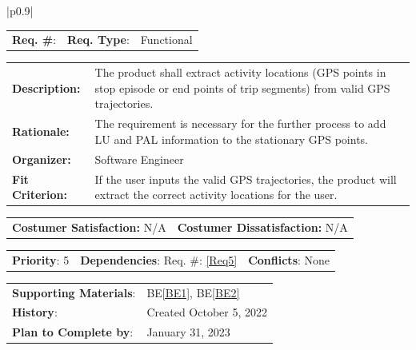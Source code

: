 \documentclass[12pt, titlepage]{article}
\newcommand{\beref}[1]{BE\ref{#1}}
\newcounter{reqnum}
\newcommand{\reqthereqnum}{\textbf{Req. \#}: \thereqnum}
\newcommand{\reqref}[1]{Req. \#: \ref{#1}}
\newenvironment{boxed}
    {\begin{center}
    \begin{tabular}{|p{0.9\textwidth}|}
    \hline\\
    }
    { 
    \\\\\hline
    \end{tabular} 
    \end{center}
    }
\begin{document}
\begin{boxed}
\begin{tabular}{l r r}
{reqnum} \reqthereqnum \label{Req7} & {\bf Req. Type}: &  Functional\\
\end{tabular}
\newline
\begin{tabular}{l p{11.5cm}}
    {\bf Description:} & The product shall extract activity locations (GPS points in stop episode or end points of trip segments) from valid GPS trajectories.  \\
    {\bf Rationale:} & The requirement is necessary for the further process to add LU and PAL information to the stationary GPS points.\\
    {\bf Organizer:} & Software Engineer\\
    {\bf Fit Criterion:} & If the user inputs the valid GPS trajectories, the product will extract the correct activity locations for the user.\\
\end{tabular}
\begin{tabular}{l r}
{\bf Costumer Satisfaction:} N/A &  {\bf Costumer Dissatisfaction:}  N/A\\
\end{tabular}
\begin{tabular}{l r r}
    {\bf Priority}: 5 & {\bf Dependencies}: \reqref{Req5}  & {\bf Conflicts}: None \\
\end{tabular}
\begin{tabular}{l l}
     {\bf Supporting Materials}:& 
     \beref{BE1}, \beref{BE2} \\ 
     {\bf History}: & Created October 5, 2022\\
     {\bf Plan to Complete by}: & January 31, 2023\\
\end{tabular}
\end{boxed}
\end{document}

